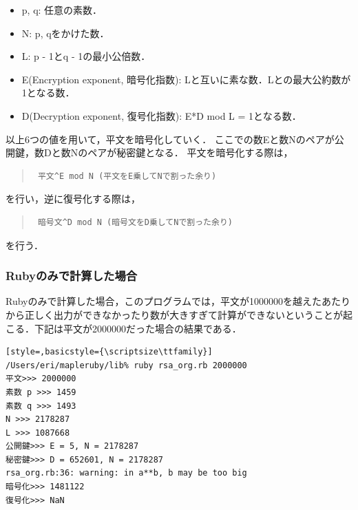 \begin{itemize}
\item p, q: 任意の素数．
\item N: p, qをかけた数．
\item L: p - 1とq - 1の最小公倍数．
\item E(Encryption exponent, 暗号化指数): Lと互いに素な数．Lとの最大公約数が1となる数．
\item D(Decryption exponent, 復号化指数): E*D mod L = 1となる数．
\end{itemize}
以上6つの値を用いて，平文を暗号化していく．
ここでの数Eと数Nのペアが公開鍵，数Dと数Nのペアが秘密鍵となる．
平文を暗号化する際は，
\begin{quote}\begin{verbatim}
 平文^E mod N (平文をE乗してNで割った余り)
\end{verbatim}\end{quote}
を行い，逆に復号化する際は，
\begin{quote}\begin{verbatim}
 暗号文^D mod N (暗号文をD乗してNで割った余り)
\end{verbatim}\end{quote}
を行う．

\subsubsection{Rubyのみで計算した場合}
Rubyのみで計算した場合，このプログラムでは，平文が1000000を越えたあたりから正しく出力ができなかったり数が大きすぎて計算ができないということが起こる．下記は平文が2000000だった場合の結果である．
\begin{lstlisting}[style=,basicstyle={\scriptsize\ttfamily}]
/Users/eri/mapleruby/lib% ruby rsa_org.rb 2000000
平文>>> 2000000
素数 p >>> 1459
素数 q >>> 1493
N >>> 2178287
L >>> 1087668
公開鍵>>> E = 5, N = 2178287
秘密鍵>>> D = 652601, N = 2178287
rsa_org.rb:36: warning: in a**b, b may be too big
暗号化>>> 1481122
復号化>>> NaN
\end{lstlisting}
